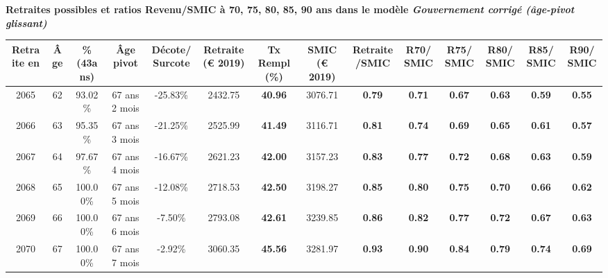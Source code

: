  \vspace{0.1cm} 
{\bf \noindent Retraites possibles et ratios Revenu/SMIC à 70, 75, 80, 85, 90 ans dans le modèle \emph{Gouvernement corrigé (âge-pivot glissant)}}  
 
\begin{adjustbox}{max width=\textwidth} 
\begin{tabular}[htb]{|c|c||c|c|c||c|c||c|c||c|c|c|c|c|} 
\hline 
 Retraite en &  Âge &  \%(43ans) &  Âge pivot &  Décote/Surcote &  Retraite (\euro{} 2019) &  Tx Rempl(\%) &  SMIC (\euro{} 2019) &  Retraite/SMIC &  R70/SMIC &  R75/SMIC &  R80/SMIC &  R85/SMIC &  R90/SMIC \\ 
\hline \hline 
 2065 &  62 &  93.02\% &  67 ans 2 mois &  -25.83\% &  2432.75 &  {\bf 40.96} &  3076.71 &  {\bf {\color{red} 0.79}} &  {\bf {\color{red} 0.71}} &  {\bf {\color{red} 0.67}} &  {\bf {\color{red} 0.63}} &  {\bf {\color{red} 0.59}} &  {\bf {\color{red} 0.55}} \\ 
\hline 
 2066 &  63 &  95.35\% &  67 ans 3 mois &  -21.25\% &  2525.99 &  {\bf 41.49} &  3116.71 &  {\bf {\color{red} 0.81}} &  {\bf {\color{red} 0.74}} &  {\bf {\color{red} 0.69}} &  {\bf {\color{red} 0.65}} &  {\bf {\color{red} 0.61}} &  {\bf {\color{red} 0.57}} \\ 
\hline 
 2067 &  64 &  97.67\% &  67 ans 4 mois &  -16.67\% &  2621.23 &  {\bf 42.00} &  3157.23 &  {\bf {\color{red} 0.83}} &  {\bf {\color{red} 0.77}} &  {\bf {\color{red} 0.72}} &  {\bf {\color{red} 0.68}} &  {\bf {\color{red} 0.63}} &  {\bf {\color{red} 0.59}} \\ 
\hline 
 2068 &  65 &  100.00\% &  67 ans 5 mois &  -12.08\% &  2718.53 &  {\bf 42.50} &  3198.27 &  {\bf {\color{red} 0.85}} &  {\bf {\color{red} 0.80}} &  {\bf {\color{red} 0.75}} &  {\bf {\color{red} 0.70}} &  {\bf {\color{red} 0.66}} &  {\bf {\color{red} 0.62}} \\ 
\hline 
 2069 &  66 &  100.00\% &  67 ans 6 mois &  -7.50\% &  2793.08 &  {\bf 42.61} &  3239.85 &  {\bf {\color{red} 0.86}} &  {\bf {\color{red} 0.82}} &  {\bf {\color{red} 0.77}} &  {\bf {\color{red} 0.72}} &  {\bf {\color{red} 0.67}} &  {\bf {\color{red} 0.63}} \\ 
\hline 
 2070 &  67 &  100.00\% &  67 ans 7 mois &  -2.92\% &  3060.35 &  {\bf 45.56} &  3281.97 &  {\bf {\color{red} 0.93}} &  {\bf {\color{red} 0.90}} &  {\bf {\color{red} 0.84}} &  {\bf {\color{red} 0.79}} &  {\bf {\color{red} 0.74}} &  {\bf {\color{red} 0.69}} \\ 
\hline 
\hline 
\end{tabular} 
\end{adjustbox} 
 

